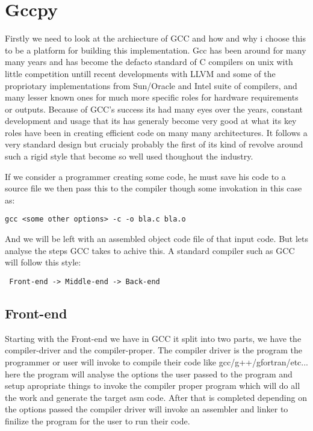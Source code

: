 \documentclass[defaultstyle,11pt]{article}
\begin{document}
\section{Gccpy}

Firstly we need to look at the archiecture of GCC and how and why i choose this to be a platform for building
this implementation. Gcc has been around for many many years and has become the defacto standard of C compilers
on unix with little competition untill recent developments with LLVM and some of the propriotary implementations
from Sun/Oracle and Intel suite of compilers, and many lesser known ones for much more specific roles for
hardware requirements or outputs. Because of GCC's success its had many eyes over the years, constant
development and usage that its has generaly become very good at what its key roles have been in creating
efficient code on many many architectures. It follows a very standard design but crucialy probably the first of
its kind of revolve around such a rigid style that become so well used thoughout the industry.

If we consider a programmer creating some code, he must save his code to a source file we then pass this
to the compiler though some invokation in this case as:

\begin{lstlisting}
gcc <some other options> -c -o bla.c bla.o
\end{lstlisting}

And we will be left with an assembled object code file of that input code. But lets analyse the steps GCC
takes to achive this. A standard compiler such as GCC will follow this style:

\begin{lstlisting}
 Front-end -> Middle-end -> Back-end
\end{lstlisting}

\subsection{Front-end}

Starting with the Front-end we have in GCC it split into two parts, we have the compiler-driver and the
compiler-proper. The compiler driver is the program the programmer or user will invoke to compile their code
like gcc/g++/gfortran/etc... here the program will analyse the options the user passed to the program and setup
apropriate things to invoke the compiler proper program which will do all the work and generate the target asm code.
After that is completed depending on the options passed the compiler driver will invoke an assembler and linker
to finilize the program for the user to run their code.
\end{document}
